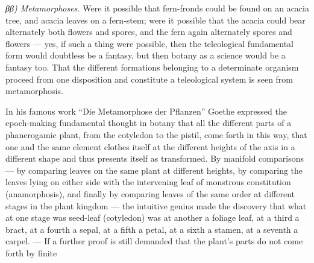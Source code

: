 \documentclass[12pt,a4paper]{book}
\begin{document}
\emph{ββ) Metamorphoses.} Were it possible that fern-fronds could be found on an
acacia tree, and acacia leaves on a fern-stem; were it possible that the acacia
could bear alternately both flowers and spores, and the fern again alternately
spores and flowers --- yes, if such a thing were possible, then the teleological
fundamental form would doubtless be a fantasy, but then botany as a science would
be a fantasy too. That the different formations belonging to a determinate organism
proceed from one disposition and constitute a teleological system is seen from
metamorphosis.

In his famous work ``Die Metamorphose der Pflanzen'' Goethe expressed the
epoch-making fundamental thought in botany that all the different parts of a
phanerogamic plant, from the cotyledon to the pistil, come forth in this way, that
one and the same element clothes itself at the different heights of the axis in a
different shape and thus presents itself as transformed. By manifold comparisons
--- by comparing leaves on the same plant at different heights, by comparing the
leaves lying on either side with the intervening leaf of monstrous constitution
(anamorphosis), and finally by comparing leaves of the same order at different
stages in the plant kingdom --- the intuitive genius made the discovery that what
at one stage was seed-leaf (cotyledon) was at another a foliage leaf, at a third a
bract, at a fourth a sepal, at a fifth a petal, at a sixth a stamen, at a seventh a
carpel. --- If a further proof is still demanded that the plant's parts do not come
forth by finite
\end{document}
